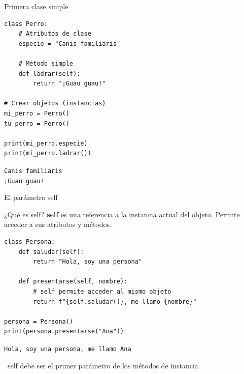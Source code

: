\documentclass{beamer}
\begin{document}
\begin{frame}[fragile]{Primera clase simple \faCode}
\begin{lstlisting}
class Perro:
    # Atributos de clase
    especie = "Canis familiaris"
    
    # Método simple
    def ladrar(self):
        return "¡Guau guau!"

# Crear objetos (instancias)
mi_perro = Perro()
tu_perro = Perro()

print(mi_perro.especie)
print(mi_perro.ladrar())
\end{lstlisting}

\vspace{-0.2cm}
\begin{tcolorbox}[colback=green!10,colframe=green,title={\small\faArrowCircleRight \ Salida},coltitle=fg0,left=3pt,right=3pt,top=2pt,bottom=2pt,boxsep=1pt]
\small\texttt{Canis familiaris\\
¡Guau guau!}
\end{tcolorbox}
\end{frame}

\begin{frame}[fragile]{El parámetro self \faUser}
\begin{conceptbox}{¿Qué es self?}
\textbf{self} es una referencia a la instancia actual del objeto. Permite acceder a sus atributos y métodos.
\end{conceptbox}

\begin{lstlisting}
class Persona:
    def saludar(self):
        return "Hola, soy una persona"
    
    def presentarse(self, nombre):
        # self permite acceder al mismo objeto
        return f"{self.saludar()}, me llamo {nombre}"

persona = Persona()
print(persona.presentarse("Ana"))
\end{lstlisting}

\vspace{-0.2cm}
\begin{tcolorbox}[colback=green!10,colframe=green,title={\small\faArrowCircleRight \ Salida},coltitle=fg0,left=3pt,right=3pt,top=2pt,bottom=2pt,boxsep=1pt]
\small\texttt{Hola, soy una persona, me llamo Ana}
\end{tcolorbox}

\vspace{-0.1cm}
\begin{notebox}
\small\faExclamationTriangle\ self debe ser el primer parámetro de los métodos de instancia
\end{notebox}
\end{frame}
\end{document}
